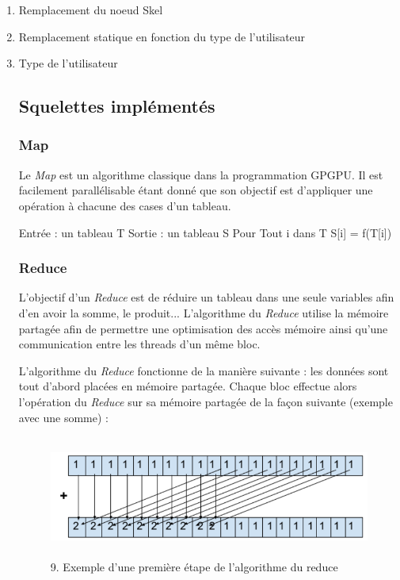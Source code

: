 \documentclass{report}
\begin{document}
\begin{enumerate}
\item Remplacement du noeud Skel
\item Remplacement statique en fonction du type de l'utilisateur
\item Type de l'utilisateur

\subsection{Squelettes implémentés}
\subsubsection{Map}
Le \textit{Map} est un algorithme classique dans la programmation GPGPU. Il est facilement parallélisable étant donné que son objectif est d'appliquer une opération à chacune des cases d'un tableau.\newline

\begin{verbatimtab} 
Entrée : un tableau T
Sortie : un tableau S
Pour Tout i dans T
    S[i] = f(T[i])
\end{verbatimtab}

\subsubsection{Reduce}
L'objectif d'un \textit{Reduce} est de réduire un tableau dans une seule variables afin d'en avoir la somme, le produit...\newline
L'algorithme du \textit{Reduce} utilise la mémoire partagée afin de permettre une optimisation des accès mémoire ainsi qu'une communication entre les threads d'un même bloc.\newline

L'algorithme du \textit{Reduce} fonctionne de la manière suivante : les données sont tout d'abord placées en mémoire partagée. Chaque bloc effectue alors l'opération du \textit{Reduce} sur sa mémoire partagée de la façon suivante (exemple avec une somme) :

\begin{figure}[!h]
\begin{center}
\includegraphics[height=150]{images_finales/schema_reduce.png}
\end{center}
\caption{9. Exemple d'une première étape de l'algorithme du reduce}
\label{test}
\end{figure} \newline


\end{enumerate}
\end{document}
